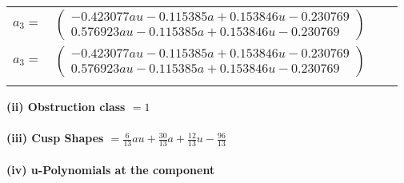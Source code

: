\documentclass[1p]{elsarticle_modified}
\theoremstyle{definition}
\begin{document}
\begin{tabular}{m{7pt} m{180pt} m{7pt} m{180pt} }
\flushright $a_{3}=$&$\begin{pmatrix}-0.423077 a u-0.115385 a+0.153846 u-0.230769\\0.576923 a u-0.115385 a+0.153846 u-0.230769\end{pmatrix}$\\ \flushright $a_{3}=$&$\begin{pmatrix}-0.423077 a u-0.115385 a+0.153846 u-0.230769\\0.576923 a u-0.115385 a+0.153846 u-0.230769\end{pmatrix}$\\&\end{tabular}
\flushleft \textbf{(ii) Obstruction class $= 1$}\\~\\
\flushleft \textbf{(iii) Cusp Shapes $= \frac{6}{13} a u+\frac{30}{13} a+\frac{12}{13} u-\frac{96}{13}$}\\~\\
\newpage\renewcommand{\arraystretch}{1}
\flushleft \textbf{(iv) u-Polynomials at the component}\newline \\
\end{document}
